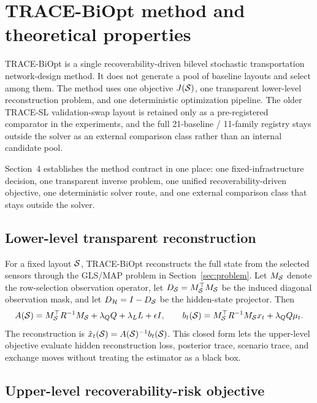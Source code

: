 \section{TRACE-BiOpt method and theoretical properties}
\label{sec:method}

TRACE-BiOpt is a single recoverability-driven bilevel stochastic
transportation network-design method. It does not generate a pool of baseline layouts
and select among them. The method uses one objective $J(\mathcal{S})$, one
transparent lower-level reconstruction problem, and one deterministic
optimization pipeline. The older TRACE-SL validation-swap layout is retained
only as a pre-registered comparator in the experiments, and the full
21-baseline / 11-family registry stays outside the solver as an external
comparison class rather than an internal candidate pool.

Section~4 establishes the method contract in one place: one fixed-infrastructure decision, one transparent inverse problem, one unified recoverability-driven objective, one deterministic solver route, and one external comparison class that stays outside the solver.


\subsection{Lower-level transparent reconstruction}

For a fixed layout $\mathcal{S}$, TRACE-BiOpt reconstructs the full state from the
selected sensors through the GLS/MAP problem in Section~\ref{sec:problem}. Let
$M_{\mathcal{S}}$ denote the row-selection observation operator, let
$D_{\mathcal{S}}=M_{\mathcal{S}}^{\top}M_{\mathcal{S}}$ be the induced diagonal observation mask,
and let $D_{\mathcal{H}}=I-D_{\mathcal{S}}$ be the hidden-state projector. Then
\[
    A(\mathcal{S})
    =
    M_{\mathcal{S}}^{\top}R^{-1}M_{\mathcal{S}}
    +\lambda_Q Q+\lambda_L L+\epsilon I,
    \qquad
    b_t(\mathcal{S})
    =
    M_{\mathcal{S}}^{\top}R^{-1}M_{\mathcal{S}}x_t+\lambda_Q Q\mu_t .
\]
The reconstruction is $\hat{x}_t(\mathcal{S})=A(\mathcal{S})^{-1}b_t(\mathcal{S})$. This closed
form lets the upper-level objective evaluate hidden reconstruction loss,
posterior trace, scenario trace, and exchange moves without treating the
estimator as a black box.

\subsection{Upper-level recoverability-risk objective}

